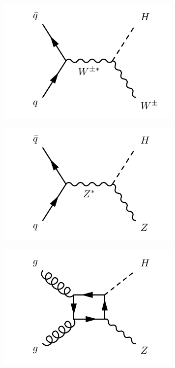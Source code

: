 \begin{figure}
\centering
\begin{subfigure}[b]{0.3\textwidth}
  \centering
  \includegraphics[width=\textwidth]{Images/VH1.pdf}
  \caption{\label{fig:vh1}}
\end{subfigure}%
\begin{subfigure}[b]{0.3\textwidth}
  \centering
  \includegraphics[width=\textwidth]{Images/VH2.pdf}
  \caption{\label{fig:vh2}}
\end{subfigure}%
\begin{subfigure}[b]{0.3\textwidth}
  \centering
  \includegraphics[width=\textwidth]{Images/VH3.pdf}

\end{subfigure}
\end{figure}
